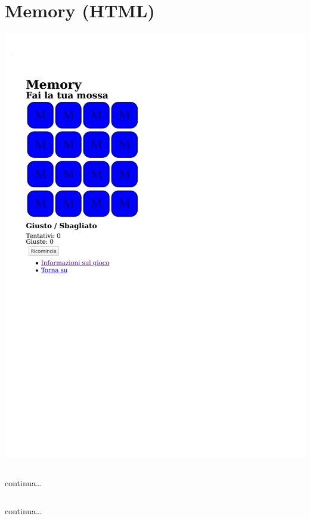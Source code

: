 \section[Memory]{Memory (HTML)}

\begin{frame}\transfade
  \begin{exercise}\centering
    \includegraphics[height=.85\textheight]{memory/html/memory.pdf}
  \end{exercise}
\end{frame}

\begin{frame}[fragile]\transfade
  \begin{sol}\centering
    \inputminted[lastline=17]{html}{memory/html/memory.html}
    continua\dots
  \end{sol}
\end{frame}
\begin{frame}[fragile]\transfade
  \begin{sol}\centering
    \inputminted[firstline=18, lastline=44, fontsize=\tiny]{html}{memory/html/memory.html}
    continua\dots
  \end{sol}
\end{frame}
\begin{frame}[fragile]\transfade
  \begin{sol}\centering
    \inputminted[firstline=46, breaklines]{html}{memory/html/memory.html}
  \end{sol}
\end{frame}
